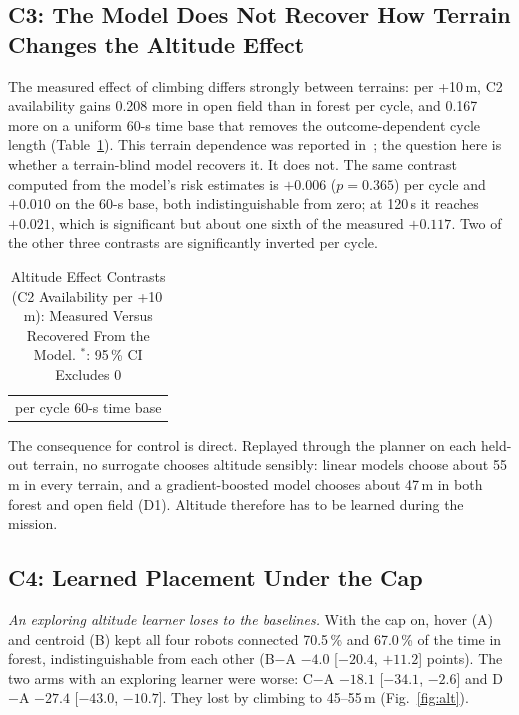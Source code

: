 \subsection{C3: The Model Does Not Recover How Terrain Changes the Altitude Effect}
\label{sec:r-flip}

The measured effect of climbing differs strongly between terrains: per +10\,m,
C2 availability gains 0.208 more in open field than in forest per cycle, and
0.167 more on a uniform 60-s time base that removes the outcome-dependent
cycle length (Table~\ref{tab:contrasts}). This terrain dependence was reported
in~\cite{makhubela2026satnac}; the question here is whether a terrain-blind
model recovers it. It does not. The same contrast computed from the model's
risk estimates is $+0.006$ ($p = 0.365$) per cycle and $+0.010$ on the 60-s
base, both indistinguishable from zero; at 120\,s it reaches $+0.021$, which is
significant but about one sixth of the measured $+0.117$. Two of the other
three contrasts are significantly inverted per cycle.

\begin{table}[t]
\caption{Altitude Effect Contrasts (C2 Availability per +10\,m): Measured
Versus Recovered From the Model. $^*$: 95\,\% CI Excludes 0}
\label{tab:contrasts}
\centering
\small
\begin{tabular}{@{}c@{}}
{\footnotesize per cycle \hspace{12mm} 60-s time base}\\[-1pt]

\end{tabular}
\end{table}

The consequence for control is direct. Replayed through the planner on each
held-out terrain, no surrogate chooses altitude sensibly: linear models choose
about 55\,m in every terrain, and a gradient-boosted model chooses about 47\,m in both
forest and open field (D1). Altitude therefore has to be learned during the
mission.

\subsection{C4: Learned Placement Under the Cap}
\label{sec:r-place}

\textit{An exploring altitude learner loses to the baselines.} With the cap on,
hover (A) and centroid (B) kept all four robots connected 70.5\,\% and
67.0\,\% of the time in forest, indistinguishable from each other (B$-$A
$-4.0$ [$-20.4$, $+11.2$] points). The two arms with an exploring learner were
worse: C$-$A $-18.1$ [$-34.1$, $-2.6$] and D$-$A $-27.4$ [$-43.0$, $-10.7$].
They lost by climbing to 45--55\,m (Fig.~\ref{fig:alt}).

